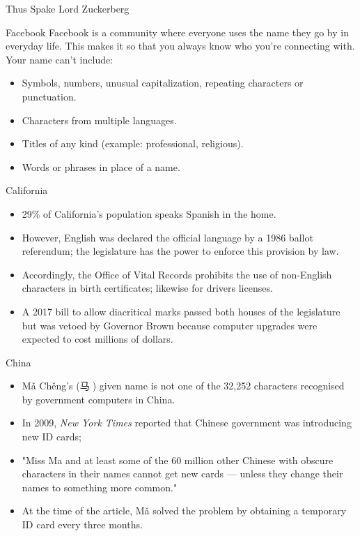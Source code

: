 \documentclass{beamer}
\begin{document}
\begin{frame}{Thus Spake Lord Zuckerberg}
\begin{aquote}{Facebook}
Facebook is a community where everyone uses the name they go by in everyday
life. This makes it so that you always know who you're connecting with. Your
name can't include:
\begin{itemize}
\item Symbols, numbers, unusual capitalization, repeating characters or punctuation.
\item Characters from multiple languages.
\item Titles of any kind (example: professional, religious).
\item Words or phrases in place of a name.
\end{itemize}
\end{aquote}\textcite{what-names-fb}
\end{frame}

\begin{frame}{California}
\begin{itemize}
\item 29\% of California's population speaks Spanish in the home.
\textcite{acs-lang-states}
\item However, English was declared the official language by a 1986 ballot
referendum; the legislature has the power to enforce this provision by law.
\item Accordingly, the Office of Vital Records prohibits the use of non-English
characters in birth certificates; likewise for drivers licenses.
\parencite{larson11}
\item A 2017 bill to allow diacritical marks passed both houses of the
legislature but was vetoed by Governor Brown because computer upgrades were
expected to cost millions of dollars.
\end{itemize}
\end{frame}

\begin{frame}{China}
\begin{itemize}
\item Mǎ Chěng's ({\zafont 马}{\zbfont 𩧢}) given name is not one of the 32,252 characters recognised
by government computers in China.
\item In 2009, \textit{New York Times} reported that Chinese government was
introducing new ID cards;
\item "Miss Ma and at least some of the 60 million other Chinese with obscure
characters in their names cannot get new cards — unless they change their names
to something more common." \parencite{lafraniere09}
\item At the time of the article, Mǎ solved the problem by obtaining a
temporary ID card every three months.
\end{itemize}
\end{frame}
\end{document}
